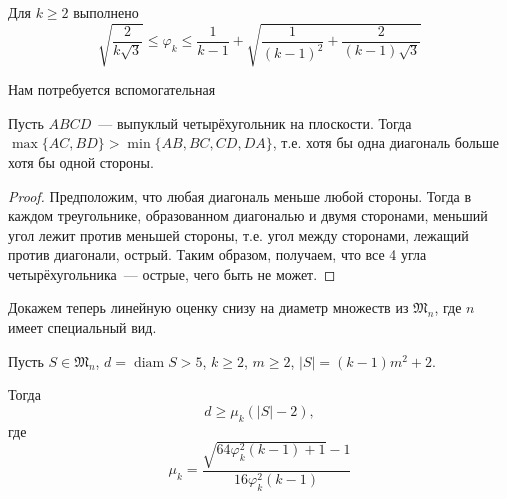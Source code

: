 \begin{theorem}%
	\label{thm:varphi_k_bounds}
	\cite{costa2013valid}
	Для $k\geq 2$ выполнено
	\begin{equation*}
		\sqrt{\frac{2}{k\sqrt{3}}}
		\leq
		\varphi_k
		\leq
		\frac{1}{k-1} +
		\sqrt{
			\frac{1}{(k-1)^2}
			+
			\frac{2}{(k-1)\sqrt{3}}
		}
	\end{equation*}
\end{theorem}

Нам потребуется вспомогательная
\begin{lemma}
	\label{lemma:quadr_diag_edges}
	Пусть $ABCD$~--- выпуклый четырёхугольник на плоскости.
	Тогда $\max\{AC,BD\}>\min\{AB,BC,CD,DA\}$,
	т.е. хотя бы одна диагональ больше хотя бы одной стороны.
\end{lemma}
\begin{proof}
	Предположим, что любая диагональ меньше любой стороны.
	Тогда в каждом треугольнике, образованном диагональю и двумя сторонами,
	меньший угол лежит против меньшей стороны,
	т.е. угол между сторонами, лежащий против диагонали, острый.
	Таким образом, получаем, что все 4 угла четырёхугольника~---
	острые, чего быть не может.
\end{proof}

Докажем теперь линейную оценку снизу на диаметр множеств из $\mathfrak{M}_n$,
где $n$ имеет специальный вид.
\begin{lemma}
	Пусть $S\in\mathfrak{M}_n$,
	$d = \operatorname{diam} S > 5$,
	$k \geq 2$,
	$m \geq 2$,
	$ |S| = (k-1)m^2 + 2$.

	Тогда
	\begin{equation}
		d \geq \mu_k (|S| - 2),
	\end{equation}
	где
	\begin{equation}
		\mu_k = \frac{\sqrt{64\varphi_k^2 (k-1)+1}-1}{16\varphi_k^2 (k-1)}
	\end{equation}
\end{lemma}

